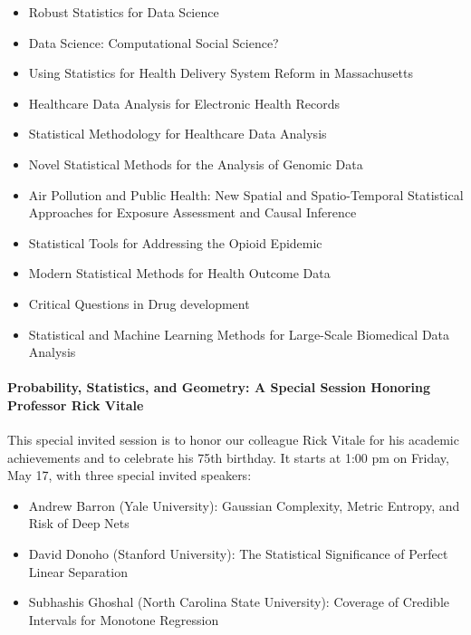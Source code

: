 \documentclass[12pt]{article}
\begin{document}
\begin{itemize}
\item
  Robust Statistics for Data Science

\item
  Data Science: Computational Social Science?

\item
  Using Statistics for Health Delivery System Reform in Massachusetts
\item
  Healthcare Data Analysis for Electronic Health Records
\item
  Statistical Methodology for Healthcare Data Analysis
\item
  Novel Statistical Methods for the Analysis of Genomic Data
\item
  Air Pollution and Public Health: New Spatial and Spatio-Temporal
  Statistical Approaches for Exposure Assessment and Causal Inference
\item
  Statistical Tools for Addressing the Opioid Epidemic
\item
  Modern Statistical Methods for Health Outcome Data
\item
  Critical Questions in Drug development
\item
  Statistical and Machine Learning Methods for Large-Scale Biomedical
  Data Analysis
\end{itemize}



\paragraph{Probability, Statistics, and Geometry: A Special Session
  Honoring Professor Rick Vitale}
This special invited session is to honor our colleague Rick Vitale for
his academic achievements and to celebrate his 75th birthday.
It starts at 1:00 pm on Friday, May 17, with three special
invited speakers:
\begin{itemize}
\item
\textsf{Andrew Barron} (Yale University): Gaussian Complexity, Metric
Entropy, and Risk of Deep Nets
\item
\textsf{David Donoho}  (Stanford University): The Statistical
Significance of Perfect Linear Separation
\item
\textsf{Subhashis Ghoshal} (North Carolina State University): Coverage
of Credible Intervals for Monotone Regression
\end{itemize}
\end{document}
